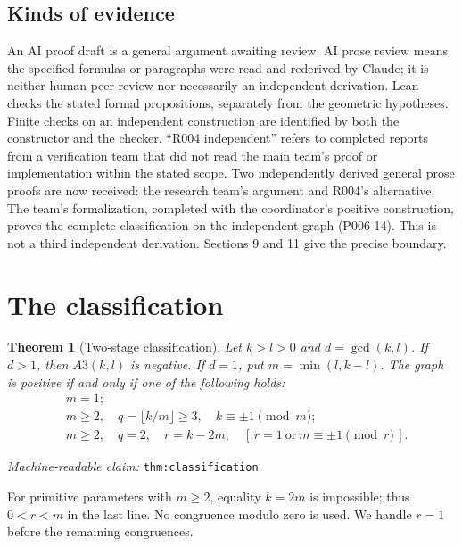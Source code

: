 \documentclass[11pt]{amsart}
\newcommand{\record}[1]{\nolinkurl{#1}}
\newtheorem{theorem}{Theorem}
\newcommand{\claimid}[1]{\par\nopagebreak\noindent\textit{Machine-readable claim:} \record{#1}.\par}
\begin{document}
\subsection{Kinds of evidence}
An AI proof draft is a general argument awaiting review. AI prose review
means the specified formulas or paragraphs were read and rederived by
Claude; it is neither human peer review nor necessarily an independent
derivation. Lean checks the stated formal propositions, separately from
the geometric hypotheses. Finite checks on an independent construction
are identified by both the constructor and the checker. ``R004
independent'' refers to completed reports from a verification team that
did not read the main team's proof or implementation within the stated
scope. Two independently derived general prose proofs are now received:
the research team's argument and R004's alternative. The team's
formalization, completed with the coordinator's positive construction,
proves the complete classification on the independent graph (P006-14).
This is not a third independent derivation. Sections 9 and 11 give the precise boundary.

\section{The classification}\label{sec:classification}
\begin{theorem}[Two-stage classification]\label{thm:classification}
Let $k>l>0$ and $d=\gcd(k,l)$. If $d>1$, then $A3(k,l)$ is negative.
If $d=1$, put $m=\min(l,k-l)$. The graph is positive if and only if
one of the following holds:
\begin{equation}\label{eq:2}
\begin{aligned}
 &m=1;\\
 &m\ge2,\quad q=\lfloor k/m\rfloor\ge3,\quad k\equiv\pm1\pmod m;\\
 &m\ge2,\quad q=2,\quad r=k-2m,\quad
       [\,r=1\ \text{or}\ m\equiv\pm1\pmod r\,].
\end{aligned}\tag{2}
\end{equation}
\end{theorem}
\claimid{thm:classification}
For primitive parameters with $m\ge2$, equality $k=2m$ is impossible;
thus $0<r<m$ in the last line. No congruence modulo zero is used.
We handle $r=1$ before the remaining congruences.
\end{document}
